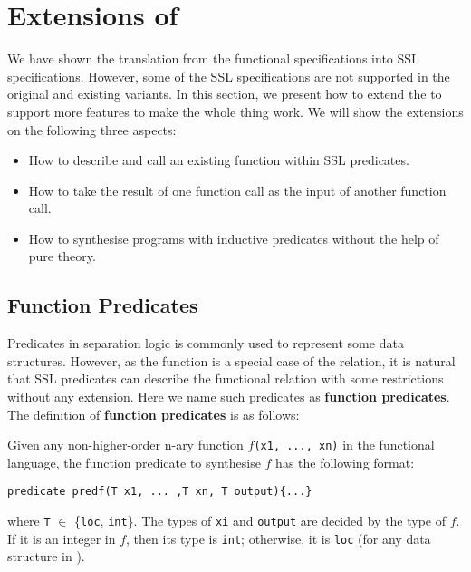 \section{Extensions of \suslik}
\label{sec:suslik-extensions}

We have shown the translation from the functional specifications into
SSL specifications. However, some of the SSL specifications are not
supported in the original \suslik and existing variants.
%
In this section, we present how to extend the \suslik to support more
features to make the whole thing work. We will show the extensions on
the following three aspects:

\begin{itemize}
  \item How to describe and call an existing function within SSL predicates.
  \item How to take the result of one function call as the input of another function call.
  \item How to synthesise programs with inductive predicates without the help of pure theory.
\end{itemize}

\subsection{Function Predicates}
\label{sec:funcPred}

Predicates in separation logic is commonly used to represent some data structures. However, as the function is a special case of the relation, it is natural that SSL predicates can describe the functional relation with some restrictions without any extension. Here we name such predicates as \textbf{function predicates}. The definition of \textbf{function predicates} is as follows:


\begin{definition}
    \label{def:funcPred}
    \normalfont
    Given any non-higher-order n-ary function $f$\lstinline{(x1, ..., xn)} in the functional language, the function predicate to synthesise $f$ has the following format:
    \begin{lstlisting}[language=SynLang]
    predicate predf(T x1, ... ,T xn, T output){...}
    \end{lstlisting}
%
    where \lstinline{T} $\in$ \{\lstinline{loc}, \lstinline{int}\}.
    The types of \lstinline{xi} and \lstinline{output} are decided by
    the type of $f$. If it is an integer in $f$, then its type is
    \lstinline{int}; otherwise, it is \lstinline{loc} (for any data
    structure in \tool).
\end{definition}

